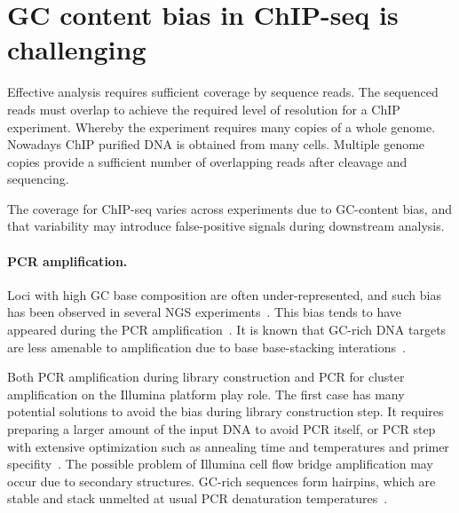 \section{GC content bias in ChIP-seq is challenging}
\label{gc}

Effective analysis requires sufficient coverage by sequence reads. 
The sequenced reads must overlap to achieve the required level of resolution for a ChIP experiment.
Whereby the experiment requires many copies of a whole genome.
Nowadays ChIP purified DNA is obtained from many cells.
Multiple genome copies provide a sufficient number of overlapping reads after cleavage and sequencing.


The coverage for ChIP-seq varies across experiments due to GC-content bias, and that variability may introduce false-positive signals during downstream analysis.
\paragraph{PCR amplification.}
Loci with high GC base composition are often under-represented, and such bias has been observed in several NGS experiments~\cite{benjamini2012summarizing,dohm2008substantial,teng2017accounting}.
This bias tends to have appeared during the PCR amplification~\cite{ross2013characterizing}.
It is known that GC-rich DNA targets are less amenable to amplification due to base base-stacking interations~\cite{yakovchuk2006base}.

Both PCR amplification during library construction and PCR for cluster amplification on the Illumina platform play role. 
The first case has many potential solutions to avoid the bias during library construction step.
It requires preparing a larger amount of the input DNA to avoid PCR itself, or PCR step with extensive optimization such as annealing time and temperatures and primer specifity~\cite{aird2011analyzing}.
The possible problem of Illumina cell flow bridge amplification may occur due to secondary structures.
GC-rich sequences form hairpins, which are stable and stack unmelted at usual PCR denaturation temperatures~\cite{stein2010nucleosome}.

